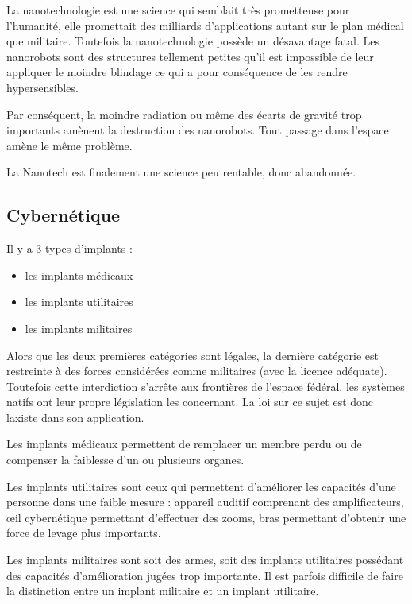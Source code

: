 \begin{multicols}{2}
La nanotechnologie est une science qui semblait très prometteuse pour l’humanité, elle promettait des milliards d’applications autant sur le plan médical que militaire. Toutefois la nanotechnologie possède un désavantage fatal. Les nanorobots sont des structures tellement petites qu’il est impossible de leur appliquer le moindre blindage ce qui a pour conséquence de les rendre hypersensibles.

Par conséquent, la moindre radiation ou même des écarts de gravité trop importants amènent la destruction des nanorobots. Tout passage dans l’espace amène le même problème.

La Nanotech est finalement une science peu rentable, donc abandonnée.

\subsection{Cybernétique}


Il y a 3 types d’implants :
\begin{itemize}
	\item les implants médicaux
	\item les implants utilitaires
	\item les implants militaires
\end{itemize}

Alors que les deux premières catégories sont légales, la dernière catégorie est restreinte à des forces considérées comme militaires (avec la licence adéquate). Toutefois cette interdiction s’arrête aux frontières de l’espace fédéral, les systèmes natifs ont leur propre législation les concernant. La loi sur ce sujet est donc laxiste dans son application.

Les implants médicaux permettent de remplacer un membre perdu ou de compenser la faiblesse d’un ou plusieurs organes.

Les implants utilitaires sont ceux qui permettent d’améliorer les capacités d’une personne dans une faible mesure : appareil auditif comprenant des amplificateurs, œil cybernétique permettant d’effectuer des zooms, bras permettant d’obtenir une force de levage plus importants.

Les implants militaires sont soit des armes, soit des implants utilitaires possédant des capacités d’amélioration jugées trop importante. Il est parfois difficile de faire la distinction entre un implant militaire et un implant utilitaire.

\end{multicols}

